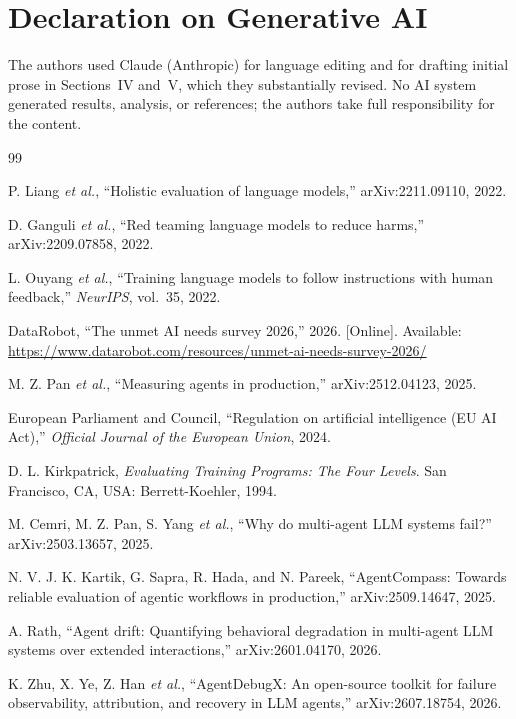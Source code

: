 \documentclass[conference]{IEEEtran}
\begin{document}
\section*{Declaration on Generative AI}

The authors used Claude (Anthropic) for language editing and for drafting initial prose in Sections~IV and~V, which they substantially revised. No AI system generated results, analysis, or references; the authors take full responsibility for the content.

\begin{thebibliography}{99}
\scriptsize

P. Liang \emph{et al.}, ``Holistic evaluation of language models,'' arXiv:2211.09110, 2022.

D. Ganguli \emph{et al.}, ``Red teaming language models to reduce harms,''
arXiv:2209.07858, 2022.

L. Ouyang \emph{et al.}, ``Training language models to follow instructions with
human feedback,'' \emph{NeurIPS}, vol.~35, 2022.

DataRobot, ``The unmet AI needs survey 2026,'' 2026. [Online]. Available:
\url{https://www.datarobot.com/resources/unmet-ai-needs-survey-2026/}

M. Z. Pan \emph{et al.}, ``Measuring agents in production,'' arXiv:2512.04123, 2025.

European Parliament and Council, ``Regulation on artificial intelligence (EU AI
Act),'' \emph{Official Journal of the European Union}, 2024.

D. L. Kirkpatrick, \emph{Evaluating Training Programs: The Four Levels}. San
Francisco, CA, USA: Berrett-Koehler, 1994.

M. Cemri, M. Z. Pan, S. Yang \emph{et al.}, ``Why do multi-agent LLM systems
fail?'' arXiv:2503.13657, 2025.

N. V. J. K. Kartik, G. Sapra, R. Hada, and N. Pareek, ``AgentCompass: Towards
reliable evaluation of agentic workflows in production,'' arXiv:2509.14647, 2025.

A. Rath, ``Agent drift: Quantifying behavioral degradation in multi-agent LLM
systems over extended interactions,'' arXiv:2601.04170, 2026.

K. Zhu, X. Ye, Z. Han \emph{et al.}, ``AgentDebugX: An open-source toolkit for
failure observability, attribution, and recovery in LLM agents,'' arXiv:2607.18754, 2026.


\end{thebibliography}
\end{document}
